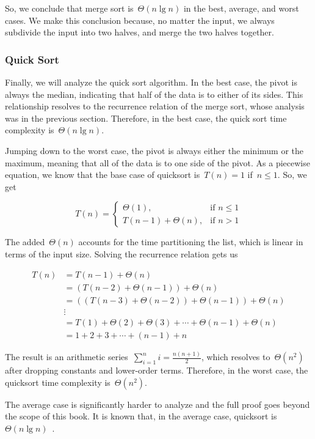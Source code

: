So, we conclude that merge sort is~$\Theta(n\lg{n})$ in the best, average, and worst cases. 
We make this conclusion because, no matter the input, we always subdivide the input into two halves, and merge the two halves together.

\subsubsection*{Quick Sort}
Finally, we will analyze the quick sort algorithm. 
In the best case, the pivot is always the median, indicating that half of the data is to either of its sides. 
This relationship resolves to the recurrence relation of the merge sort, whose analysis was in the previous section. 
Therefore, in the best case, the quick sort time complexity is~$\Theta(n \lg n)$. 

Jumping down to the worst case, the pivot is always either the minimum or the maximum, meaning that all of the data is to one side of the pivot. 
As a piecewise equation, we know that the base case of quicksort is~$T(n) = 1$ if~$n \leq 1$. So, we get

\[
T(n)=
  \begin{cases}
    \Theta(1), & \text{if } n \leq 1\\
    T(n - 1) + \Theta(n), & \text{if } n > 1
  \end{cases}
\]

The added~$\Theta(n)$ accounts for the time partitioning the list, which is linear in terms of the input size. 
Solving the recurrence relation gets us

\begin{align*}
T(n) &= T(n - 1) + \Theta(n)\\
     &= (T(n - 2) + \Theta(n - 1)) + \Theta(n)\\
     &= ((T(n - 3) + \Theta(n - 2)) + \Theta(n - 1)) + \Theta(n)\\
     &\vdots\\
     &= T(1) + \Theta(2) + \Theta(3) + \cdots + \Theta(n - 1) + \Theta(n)\\
     &= 1 + 2 + 3 + \cdots + (n - 1) + n
\end{align*}

The result is an arithmetic series~$\sum_{i=1}^{n}{i}=\frac{n(n+1)}{2}$, which resolves to~$\Theta(n^2)$ after dropping constants and lower-order terms. 
Therefore, in the worst case, the quicksort time complexity is~$\Theta(n^2)$.

The average case is significantly harder to analyze and the full proof goes beyond the scope of this book. 
It is known that, in the average case, quicksort is~$\Theta(n\lg{n})$~. 

